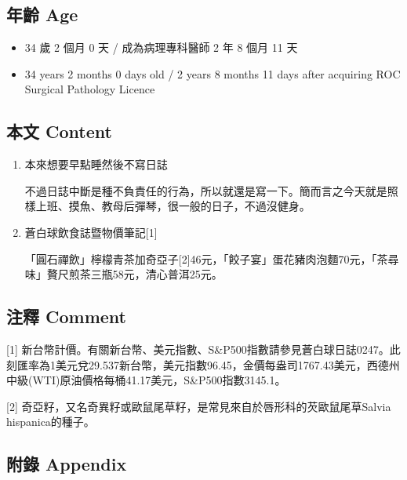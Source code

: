 \documentclass[
]{article}
\providecommand{\tightlist}{%
  \setlength{\itemsep}{0pt}\setlength{\parskip}{0pt}}
\begin{document}
\hypertarget{ux5e74ux9f61-age-20}{%
\subsection{年齡 Age}\label{ux5e74ux9f61-age-20}}

\begin{itemize}
\tightlist
\item
  34 歲 2 個月 0 天 / 成為病理專科醫師 2 年 8 個月 11 天
\item
  34 years 2 months 0 days old / 2 years 8 months 11 days after
  acquiring ROC Surgical Pathology Licence
\end{itemize}

\hypertarget{ux672cux6587-content-20}{%
\subsection{本文 Content}\label{ux672cux6587-content-20}}

\begin{enumerate}
\def\labelenumi{\arabic{enumi}.}
\item
  本來想要早點睡然後不寫日誌

  不過日誌中斷是種不負責任的行為，所以就還是寫一下。簡而言之今天就是照樣上班、摸魚、教母后彈琴，很一般的日子，不過沒健身。
\item
  蒼白球飲食誌暨物價筆記{[}1{]}

  「圓石禪飲」檸檬青茶加奇亞子{[}2{]}46元，「餃子宴」蛋花豬肉泡麵70元，「茶尋味」贅尺煎茶三瓶58元，清心普洱25元。
\end{enumerate}

\hypertarget{ux6ce8ux91cb-comment-20}{%
\subsection{注釋 Comment}\label{ux6ce8ux91cb-comment-20}}

{[}1{]}
新台幣計價。有關新台幣、美元指數、S\&P500指數請參見蒼白球日誌0247。此刻匯率為1美元兌29.537新台幣，美元指數96.45，金價每盎司1767.43美元，西德州中級(WTI)原油價格每桶41.17美元，S\&P500指數3145.1。

{[}2{]}
奇亞籽，又名奇異籽或歐鼠尾草籽，是常見來自於唇形科的芡歐鼠尾草Salvia
hispanica的種子。

\hypertarget{ux9644ux9304-appendix-20}{%
\subsection{附錄 Appendix}\label{ux9644ux9304-appendix-20}}
\end{document}
